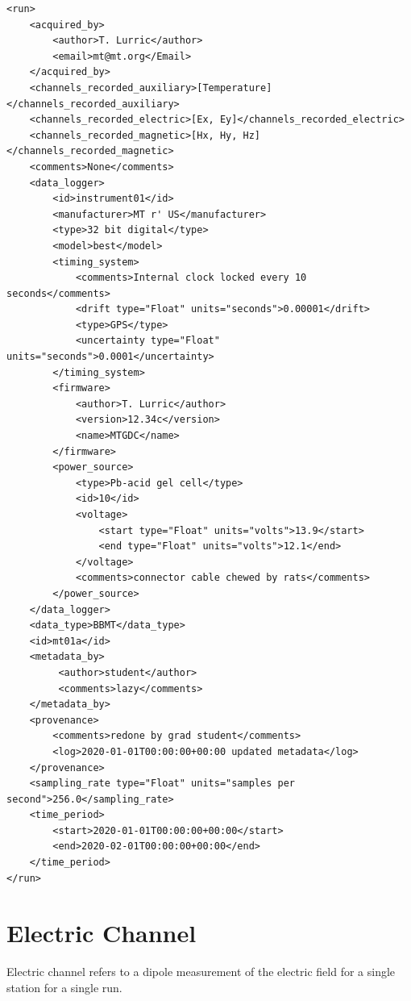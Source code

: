 \documentclass[12pt]{article}
\begin{document}
\begin{verbatim}
<run>
    <acquired_by>
        <author>T. Lurric</author>
        <email>mt@mt.org</Email>
    </acquired_by>
    <channels_recorded_auxiliary>[Temperature]</channels_recorded_auxiliary>
    <channels_recorded_electric>[Ex, Ey]</channels_recorded_electric>
    <channels_recorded_magnetic>[Hx, Hy, Hz]</channels_recorded_magnetic>
    <comments>None</comments>
    <data_logger>
        <id>instrument01</id>
        <manufacturer>MT r' US</manufacturer>
        <type>32 bit digital</type>
        <model>best</model>
        <timing_system>
            <comments>Internal clock locked every 10 seconds</comments>
            <drift type="Float" units="seconds">0.00001</drift>
            <type>GPS</type>
            <uncertainty type="Float" units="seconds">0.0001</uncertainty>
        </timing_system>
        <firmware>
            <author>T. Lurric</author>
            <version>12.34c</version>
            <name>MTGDC</name>
        </firmware>
        <power_source>
            <type>Pb-acid gel cell</type>
            <id>10</id>
            <voltage>
                <start type="Float" units="volts">13.9</start>
                <end type="Float" units="volts">12.1</end>
            </voltage>
            <comments>connector cable chewed by rats</comments>
        </power_source>
    </data_logger>
    <data_type>BBMT</data_type>
    <id>mt01a</id>
    <metadata_by>
         <author>student</author>
         <comments>lazy</comments>
    </metadata_by>
    <provenance>
        <comments>redone by grad student</comments>
        <log>2020-01-01T00:00:00+00:00 updated metadata</log>
    </provenance>
    <sampling_rate type="Float" units="samples per second">256.0</sampling_rate>
    <time_period>
        <start>2020-01-01T00:00:00+00:00</start>
        <end>2020-02-01T00:00:00+00:00</end>
    </time_period>
</run>
\end{verbatim}


\newpage
\section{Electric Channel}

Electric channel refers to a dipole measurement of the electric field for a single station for a single run.  
\end{document}
